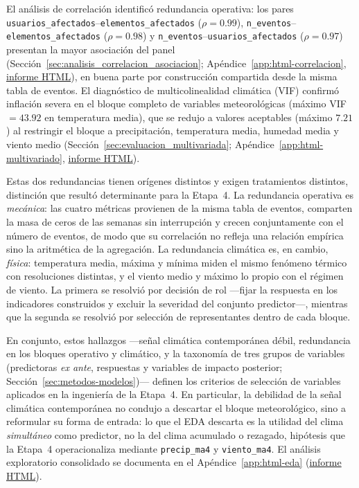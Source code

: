 El análisis de correlación identificó redundancia operativa: los pares \texttt{usuarios\_afectados}--\texttt{elementos\_afectados} ($\rho=0{.}99$), \texttt{n\_eventos}--\texttt{elementos\_afectados} ($\rho=0{.}98$) y \texttt{n\_eventos}--\texttt{usuarios\_afectados} ($\rho=0{.}97$) presentan la mayor asociación del panel (Sección~\ref{sec:analisis_correlacion_asociacion}; Apéndice~\ref{app:html-correlacion}, \href{\urlanalisisCorrelacion}{informe HTML}), en buena parte por construcción compartida desde la misma tabla de eventos. El diagnóstico de multicolinealidad climática (VIF) confirmó inflación severa en el bloque completo de variables meteorológicas (máximo VIF $=43{.}92$ en temperatura media), que se redujo a valores aceptables (máximo $7{.}21$) al restringir el bloque a precipitación, temperatura media, humedad media y viento medio (Sección~\ref{sec:evaluacion_multivariada}; Apéndice~\ref{app:html-multivariado}, \href{\urlanalisisMultivariado}{informe HTML}).

Estas dos redundancias tienen orígenes distintos y exigen tratamientos distintos, distinción que resultó determinante para la Etapa~4. La redundancia operativa es \textit{mecánica}: las cuatro métricas provienen de la misma tabla de eventos, comparten la masa de ceros de las semanas sin interrupción y crecen conjuntamente con el número de eventos, de modo que su correlación no refleja una relación empírica sino la aritmética de la agregación. La redundancia climática es, en cambio, \textit{física}: temperatura media, máxima y mínima miden el mismo fenómeno térmico con resoluciones distintas, y el viento medio y máximo lo propio con el régimen de viento. La primera se resolvió por decisión de rol —fijar la respuesta en los indicadores construidos y excluir la severidad del conjunto predictor—, mientras que la segunda se resolvió por selección de representantes dentro de cada bloque.

En conjunto, estos hallazgos —señal climática contemporánea débil, redundancia en los bloques operativo y climático, y la taxonomía de tres grupos de variables (predictoras \emph{ex ante}, respuestas y variables de impacto posterior; Sección~\ref{sec:metodos-modelos})— definen los criterios de selección de variables aplicados en la ingeniería de la Etapa~4. En particular, la debilidad de la señal climática contemporánea no condujo a descartar el bloque meteorológico, sino a reformular su forma de entrada: lo que el EDA descarta es la utilidad del clima \textit{simultáneo} como predictor, no la del clima acumulado o rezagado, hipótesis que la Etapa~4 operacionaliza mediante \texttt{precip\_ma4} y \texttt{viento\_ma4}. El análisis exploratorio consolidado se documenta en el Apéndice~\ref{app:html-eda} (\href{\urlEDA}{informe HTML}).


